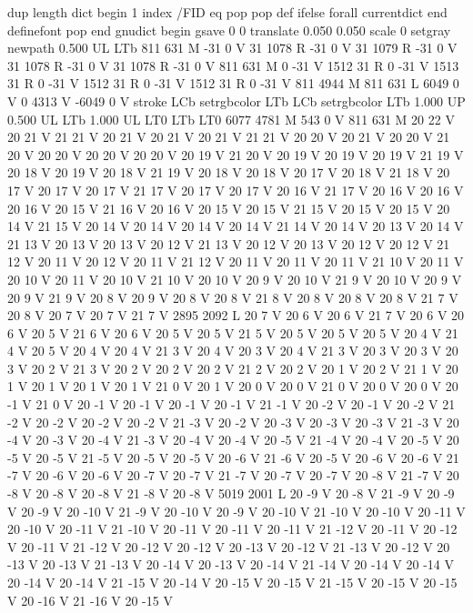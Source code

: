 {{{{{dup length dict begin {1 index /FID eq {pop pop} {def} ifelse} forall
currentdict end definefont pop
end
gnudict begin
gsave
0 0 translate
0.050 0.050 scale
0 setgray
newpath
0.500 UL
LTb
811 631 M
-31 0 V
31 1078 R
-31 0 V
31 1079 R
-31 0 V
31 1078 R
-31 0 V
31 1078 R
-31 0 V
811 631 M
0 -31 V
1512 31 R
0 -31 V
1513 31 R
0 -31 V
1512 31 R
0 -31 V
1512 31 R
0 -31 V
811 4944 M
811 631 L
6049 0 V
0 4313 V
-6049 0 V
stroke
LCb setrgbcolor
LTb
LCb setrgbcolor
LTb
1.000 UP
0.500 UL
LTb
1.000 UL
LT0
LTb
LT0
6077 4781 M
543 0 V
811 631 M
20 22 V
20 21 V
21 21 V
20 21 V
20 21 V
20 21 V
21 21 V
20 20 V
20 21 V
20 20 V
21 20 V
20 20 V
20 20 V
20 20 V
20 19 V
21 20 V
20 19 V
20 19 V
20 19 V
21 19 V
20 18 V
20 19 V
20 18 V
21 19 V
20 18 V
20 18 V
20 17 V
20 18 V
21 18 V
20 17 V
20 17 V
20 17 V
21 17 V
20 17 V
20 17 V
20 16 V
21 17 V
20 16 V
20 16 V
20 16 V
20 15 V
21 16 V
20 16 V
20 15 V
20 15 V
21 15 V
20 15 V
20 15 V
20 14 V
21 15 V
20 14 V
20 14 V
20 14 V
20 14 V
21 14 V
20 14 V
20 13 V
20 14 V
21 13 V
20 13 V
20 13 V
20 12 V
21 13 V
20 12 V
20 13 V
20 12 V
20 12 V
21 12 V
20 11 V
20 12 V
20 11 V
21 12 V
20 11 V
20 11 V
20 11 V
21 10 V
20 11 V
20 10 V
20 11 V
20 10 V
21 10 V
20 10 V
20 9 V
20 10 V
21 9 V
20 10 V
20 9 V
20 9 V
21 9 V
20 8 V
20 9 V
20 8 V
20 8 V
21 8 V
20 8 V
20 8 V
20 8 V
21 7 V
20 8 V
20 7 V
20 7 V
21 7 V
2895 2092 L
20 7 V
20 6 V
20 6 V
21 7 V
20 6 V
20 6 V
20 5 V
21 6 V
20 6 V
20 5 V
20 5 V
21 5 V
20 5 V
20 5 V
20 5 V
20 4 V
21 4 V
20 5 V
20 4 V
20 4 V
21 3 V
20 4 V
20 3 V
20 4 V
21 3 V
20 3 V
20 3 V
20 3 V
20 2 V
21 3 V
20 2 V
20 2 V
20 2 V
21 2 V
20 2 V
20 1 V
20 2 V
21 1 V
20 1 V
20 1 V
20 1 V
20 1 V
21 0 V
20 1 V
20 0 V
20 0 V
21 0 V
20 0 V
20 0 V
20 -1 V
21 0 V
20 -1 V
20 -1 V
20 -1 V
20 -1 V
21 -1 V
20 -2 V
20 -1 V
20 -2 V
21 -2 V
20 -2 V
20 -2 V
20 -2 V
21 -3 V
20 -2 V
20 -3 V
20 -3 V
20 -3 V
21 -3 V
20 -4 V
20 -3 V
20 -4 V
21 -3 V
20 -4 V
20 -4 V
20 -5 V
21 -4 V
20 -4 V
20 -5 V
20 -5 V
20 -5 V
21 -5 V
20 -5 V
20 -5 V
20 -6 V
21 -6 V
20 -5 V
20 -6 V
20 -6 V
21 -7 V
20 -6 V
20 -6 V
20 -7 V
20 -7 V
21 -7 V
20 -7 V
20 -7 V
20 -8 V
21 -7 V
20 -8 V
20 -8 V
20 -8 V
21 -8 V
20 -8 V
5019 2001 L
20 -9 V
20 -8 V
21 -9 V
20 -9 V
20 -9 V
20 -10 V
21 -9 V
20 -10 V
20 -9 V
20 -10 V
21 -10 V
20 -10 V
20 -11 V
20 -10 V
20 -11 V
21 -10 V
20 -11 V
20 -11 V
20 -11 V
21 -12 V
20 -11 V
20 -12 V
20 -11 V
21 -12 V
20 -12 V
20 -12 V
20 -13 V
20 -12 V
21 -13 V
20 -12 V
20 -13 V
20 -13 V
21 -13 V
20 -14 V
20 -13 V
20 -14 V
21 -14 V
20 -14 V
20 -14 V
20 -14 V
20 -14 V
21 -15 V
20 -14 V
20 -15 V
20 -15 V
21 -15 V
20 -15 V
20 -15 V
20 -16 V
21 -16 V
20 -15 V
}}}}}
